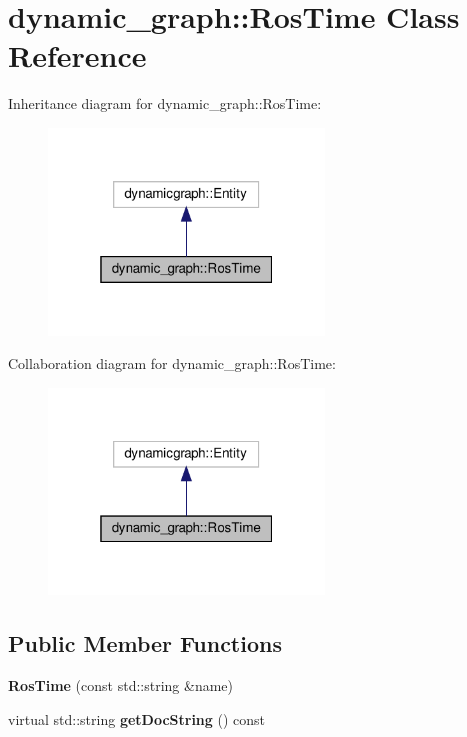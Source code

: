 \hypertarget{classdynamic__graph_1_1RosTime}{}\section{dynamic\+\_\+graph\+:\+:Ros\+Time Class Reference}
\label{classdynamic__graph_1_1RosTime}


Inheritance diagram for dynamic\+\_\+graph\+:\+:Ros\+Time\+:
\nopagebreak
\begin{figure}[H]
\begin{center}
\leavevmode
\includegraphics[width=208pt]{classdynamic__graph_1_1RosTime__inherit__graph}
\end{center}
\end{figure}


Collaboration diagram for dynamic\+\_\+graph\+:\+:Ros\+Time\+:
\nopagebreak
\begin{figure}[H]
\begin{center}
\leavevmode
\includegraphics[width=208pt]{classdynamic__graph_1_1RosTime__coll__graph}
\end{center}
\end{figure}
\subsection*{Public Member Functions}
\begin{DoxyCompactItemize}
\item 
\mbox{\label{classdynamic__graph_1_1RosTime_aa909f2b766b54a543a59ae8642db3bc0}} 
{\bfseries Ros\+Time} (const std\+::string \&name)
\item 
\mbox{\label{classdynamic__graph_1_1RosTime_aa3ac7518620c6a914d8f7d69694229d2}} 
virtual std\+::string {\bfseries get\+Doc\+String} () const
\end{DoxyCompactItemize}
